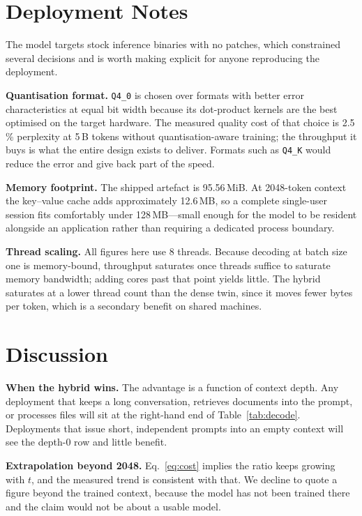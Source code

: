 \documentclass[conference]{IEEEtran}
\begin{document}
\section{Deployment Notes}

The model targets stock inference binaries with no patches, which constrained
several decisions and is worth making explicit for anyone reproducing the
deployment.

\textbf{Quantisation format.} \texttt{Q4\_0} is chosen over formats with better
error characteristics at equal bit width because its dot-product kernels are the
best optimised on the target hardware. The measured quality cost of that choice
is 2.5\,\% perplexity at 5\,B tokens without quantisation-aware training; the
throughput it buys is what the entire design exists to deliver. Formats such as
\texttt{Q4\_K} would reduce the error and give back part of the speed.

\textbf{Memory footprint.} The shipped artefact is 95.56\,MiB. At 2048-token
context the key--value cache adds approximately 12.6\,MB, so a complete
single-user session fits comfortably under 128\,MB---small enough for the model
to be resident alongside an application rather than requiring a dedicated
process boundary.

\textbf{Thread scaling.} All figures here use 8 threads. Because decoding at
batch size one is memory-bound, throughput saturates once threads suffice to
saturate memory bandwidth; adding cores past that point yields little. The
hybrid saturates at a lower thread count than the dense twin, since it moves
fewer bytes per token, which is a secondary benefit on shared machines.

\section{Discussion}

\textbf{When the hybrid wins.} The advantage is a function of context depth. Any
deployment that keeps a long conversation, retrieves documents into the prompt,
or processes files will sit at the right-hand end of Table~\ref{tab:decode}.
Deployments that issue short, independent prompts into an empty context will see
the depth-0 row and little benefit.

\textbf{Extrapolation beyond 2048.} Eq.~\eqref{eq:cost} implies the ratio keeps
growing with $t$, and the measured trend is consistent with that. We decline to
quote a figure beyond the trained context, because the model has not been
trained there and the claim would not be about a usable model.
\end{document}

